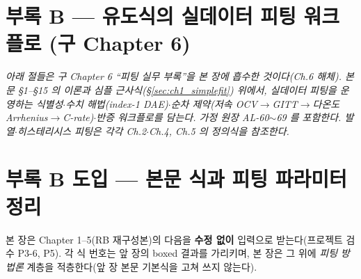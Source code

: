 \documentclass[11pt,a4paper]{article}
\begin{document}
\section*{\normalfont\Large 부록 B — 유도식의 실데이터 피팅 워크플로 (구 Chapter 6)}
\label{sec:ch1_fitting_practice}
\noindent\emph{아래 절들은 구 Chapter 6 ``피팅 실무 부록''을 본 장에 흡수한 것이다(Ch.6 해체). 본문 \S1--\S15 의 이론과 심플 근사식(\S\ref{sec:ch1_simplefit}) 위에서, 실데이터 피팅을 운영하는 식별성$\cdot$수치 해법(index-1 DAE)$\cdot$순차 제약(저속 OCV$\to$GITT$\to$다온도 Arrhenius$\to$C-rate)$\cdot$반증 워크플로를 담는다. 가정 원장 AL-60$\sim$69 를 포함한다. 발열$\cdot$히스테리시스 피팅은 각각 Ch.2$\cdot$Ch.4, Ch.5 의 정의식을 참조한다.}
\section{부록 B 도입 — 본문 식과 피팅 파라미터 정리}\label{sec:ch6_inherit}
본 장은 Chapter 1--5(RB 재구성본)의 다음을 \textbf{수정 없이} 입력으로 받는다(프로젝트 검수 P3-6, P5). 각 식
번호는 앞 장의 boxed 결과를 가리키며, 본 장은 그 위에 \emph{피팅 방법론} 계층을 적층한다(앞 장 본문 기본식을
고쳐 쓰지 않는다).
\end{document}
